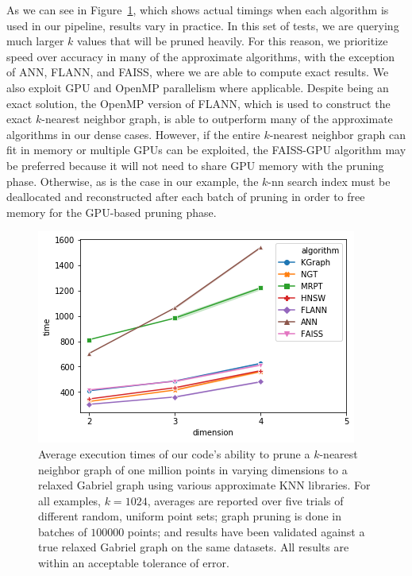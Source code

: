 As we can see in Figure~\ref{fig:knn_benchmark}, which shows actual timings when each algorithm is used in our pipeline, results vary in practice.
%
In this set of tests, we are querying much larger $k$ values that will be pruned heavily.
%
For this reason, we prioritize speed over accuracy in many of the approximate algorithms, with the exception of ANN, FLANN, and FAISS, where we are able to compute exact results.
%
We also exploit GPU and OpenMP parallelism where applicable.
%
Despite being an exact solution, the OpenMP version of FLANN, which is used to construct the exact $k$-nearest neighbor graph, is able to outperform many of the approximate algorithms in our dense cases.
%
However, if the entire $k$-nearest neighbor graph can fit in memory or multiple GPUs can be exploited, the FAISS-GPU algorithm may be preferred because it will not need to share GPU memory with the pruning phase.
%
Otherwise, as is the case in our example, the $k$-nn search index must be deallocated and reconstructed after each batch of pruning in order to free memory for the GPU-based pruning phase.

\begin{figure}[t]
    \centering
      \includegraphics[width=.95\linewidth]{figs/chap7/relaxed_gabriel_benchmark_1M.png}
    \caption[Custom benchmark performance for various $k$-nn implementations]{Average execution times of our code's ability to prune a
    $k$-nearest neighbor graph of one million points in varying dimensions
    to a relaxed Gabriel graph using various approximate KNN libraries.
    For all examples, $k=1024$, averages are reported over five trials
    of different random, uniform point sets; graph pruning is done
    in batches of $100000$ points; and results have been
    validated against a true relaxed Gabriel graph on the same datasets.
    All results are within an acceptable tolerance of error.
  }
  \label{fig:knn_benchmark}
\end{figure}

